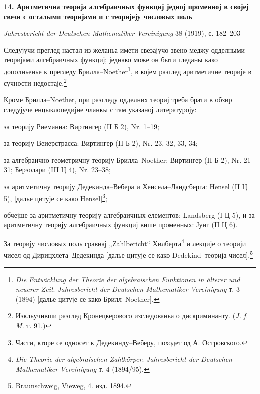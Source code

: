 ﻿\documentclass[11pt]{article}
\begin{document}

\begin{center}
{\Large\bfseries 14. Аритметична теорија алгебраичных функциј једној променној в својеј свези с осталыми теоријами и с теоријеју числовых поль\par}
\vspace{1.5em}
\emph{Jahresbericht der Deutschen Mathematiker-Vereinigung} 38 (1919), с. 182--203
\end{center}

Следујучи преглед настал из желаньа имети свезајучо звено меджу одделными теоријами алгебраичных функциј; једнако може он быти гледаны како дополньенье к прегледу Брилла--Noether\footnote{\emph{Die Entwicklung der Theorie der algebraischen Funktionen in älterer und neuerer Zeit}. \emph{Jahresbericht der Deutschen Mathematiker-Vereinigung} т. 3 (1894) [далье цитује се како Брилл--Noether].}, в којем разглед аритметичне теорије в сучности недостаје.\footnote{Изкльучивши разглед Кронецкерового изследованьа о дискриминанту. (\emph{J. f. M.} т. 91.)}

Кроме Брилла--Noether, при разгледу одделних теориј треба брати в обзир следујуче енцыклопедијне чланкы с там указаној литературоју:

за теорију Риеманна: Виртингер (II Б 2), Nr. 1--19;

за теорију Веиерстрасса: Виртингер (II Б 2), Nr. 23, 32, 33, 34;

за алгебраично-геометричну теорију Брилла--Noether: Виртингер (II Б 2), Nr. 21--31; Берзолари (III Ц 4), Nr. 23--38;

за аритметичну теорију Дедекинда--Вебера и Хенсела--Ландсберга: Hensel (II Ц 5), [далье цитује се како Hensel]\footnote{Части, кторе се односет к Дедекинду--Веберу, походет од А. Островского.};

обчејше за аритметичну теорију алгебраичных елементов: Landsberg (I Ц 5), и за аритметичну теорију алгебраичных функциј више променных: Јунг (II Ц 6).

За теорију числовых поль сравнај „Zahlbericht“ Хилберта\footnote{\emph{Die Theorie der algebraischen Zahlkörper}. \emph{Jahresbericht der Deutschen Mathematiker-Vereinigung} т. 4 (1894/95).} и лекције о теорији чисел од Дирицхлета--Дедекинда [далье цитује се како Dedekind--теорија чисел].\footnote{Braunschweig, Vieweg, 4. изд. 1894.}
\end{document}
